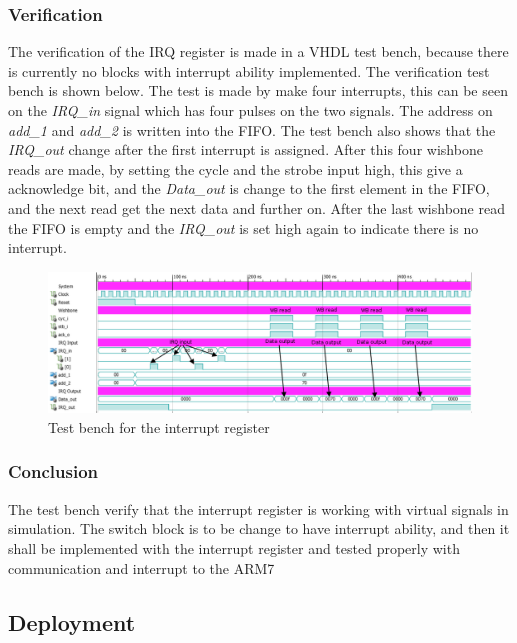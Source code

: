 \subsubsection{Verification}
The verification of the IRQ register is made in a VHDL test bench, because there is currently no blocks with interrupt ability implemented. The verification test bench is shown below. The test is made by make four interrupts, this can be seen on the \textit{IRQ\_in} signal which has four pulses on the two signals. The address on \textit{add\_1} and \textit{add\_2} is written into the FIFO. The test bench also shows that the \textit{IRQ\_out} change after the first interrupt is assigned. After this four wishbone reads are made, by setting the cycle and the strobe input high, this give a acknowledge bit, and the \textit{Data\_out} is change to the first element in the FIFO, and the next read get the next data and further on. After the last wishbone read the FIFO is empty and the \textit{IRQ\_out} is set high again to indicate there is no interrupt.
\begin{figure}[H]
	\begin{centering}
		\includegraphics[width=1.0\textwidth]{images/tb5_irq_reg_testbench1.png}
		\caption{Test bench for the interrupt register}
	\end{centering}
\end{figure}
%
\subsubsection{Conclusion}
The test bench verify that the interrupt register is working with virtual signals in simulation. The switch block is to be change to have interrupt ability, and then it shall be implemented with the interrupt register and tested properly with communication and interrupt to the ARM7


\subsection{Deployment}
